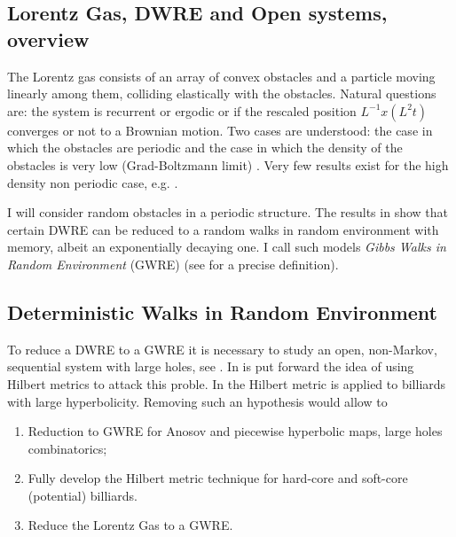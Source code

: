 \documentclass[10pt, a4paper, reqno]{amsart}
\begin{document}
\subsection*{{\color{magenta}Lorentz Gas, DWRE and Open systems, overview}}\label{sec:2open}
The Lorentz gas consists of an array of convex obstacles and a particle moving linearly among them, colliding elastically with the obstacles.  Natural questions are: the system is recurrent or ergodic or if the rescaled position $L^{-1}x(L^2 t)$ converges or not to a Brownian motion. Two cases are understood: the case in which the obstacles are periodic \cite{BS91b} and the case in which the density of the obstacles is very low (Grad-Boltzmann limit) \cite{MS11, LT19b2}.
Very few results exist for the high density non periodic case, e.g. \cite{DSV9,Le06b2,CLS0}. 

I will consider random obstacles in a periodic structure. 
The results in \cite{AL18b} show that certain DWRE can be reduced to a random walks in random environment with memory, albeit an exponentially decaying one. I call such models {\em Gibbs Walks in Random Environment} (GWRE) (see \cite{AL18b} for a precise definition). 

\subsection{Deterministic Walks in Random Environment}\label{sec:2reduce}
To reduce a DWRE to a GWRE it is necessary to study an open, non-Markov, sequential system with large holes, see \cite{AL18b}.
In \cite{LM03, AL18b} is put forward the idea of using Hilbert metrics to attack this proble. In \cite{DL21} the Hilbert metric is applied to billiards with large hyperbolicity. Removing such an hypothesis would allow to 
\begin{enumerate}
\item Reduction to GWRE for Anosov and piecewise hyperbolic maps, large holes combinatorics;
\item Fully develop the Hilbert metric technique for hard-core and soft-core (potential) billiards.
\item Reduce the Lorentz Gas to a GWRE.
\end{enumerate}
\end{document}

